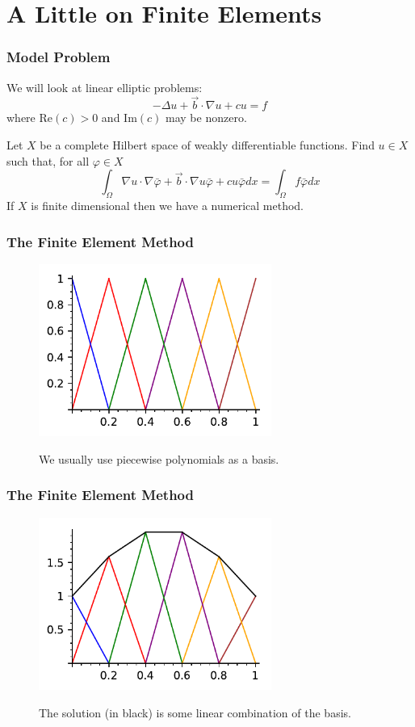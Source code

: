 \documentclass[8pt]{beamer}
\begin{document}
\section{A Little on Finite Elements}
\begin{frame}
    \frametitle{Model Problem}
    We will look at linear elliptic problems:
    \begin{equation*}
        -\Delta u + \vec{b} \cdot \nabla u + c u = f
    \end{equation*}
    where \(\mathrm{Re}(c) > 0\) and \(\mathrm{Im}(c)\) may be nonzero.

    \pause
    \vspace{0.5in}
    Let \(X\) be a complete Hilbert space of weakly differentiable
    functions. Find \(u \in X\) such that, for all \(\varphi \in X\)
    \begin{equation*}
        \int_\Omega \nabla u \cdot \nabla \bar{\varphi}
        + \vec{b} \cdot \nabla u \bar{\varphi}
        + c u \bar{\varphi}
        dx
        =
        \int_\Omega f \bar{\varphi} dx
    \end{equation*}
    If \(X\) is finite dimensional then we have a numerical method.
\end{frame}

\begin{frame}
    \frametitle{The Finite Element Method}
    \begin{figure}
        \centering
        \includegraphics[width=3in]{fe-basis.pdf}

        We usually use piecewise polynomials as a basis.
    \end{figure}
\end{frame}

\begin{frame}
    \frametitle{The Finite Element Method}
    \begin{figure}
        \centering
        \includegraphics[width=3in]{fe-interpolation.pdf}

        The solution (in black) is some linear combination of the basis.
    \end{figure}
\end{frame}
\end{document}
